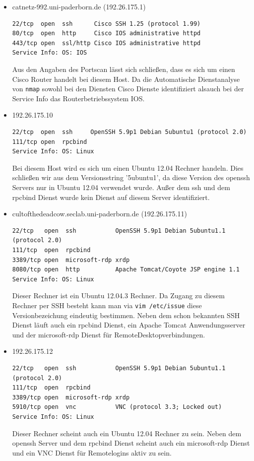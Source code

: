 \documentclass[10pt,a4paper]{article}
\begin{document}
\begin{itemize}
\item catnetz-992.uni-paderborn.de (192.26.175.1)
\begin{verbatim}
22/tcp  open  ssh      Cisco SSH 1.25 (protocol 1.99)
80/tcp  open  http     Cisco IOS administrative httpd
443/tcp open  ssl/http Cisco IOS administrative httpd
Service Info: OS: IOS
\end{verbatim}
Aus den Angaben des Portscan lässt sich schließen, dass es sich um einen Cisco Router handelt bei diesem Host. Da die Automatische Dienstanalyse von \texttt{nmap} sowohl bei den Diensten Cisco Dienste identifiziert alsauch bei der Service Info das Routerbetriebssystem IOS. 
\item 192.26.175.10
\begin{verbatim}
22/tcp  open  ssh     OpenSSH 5.9p1 Debian 5ubuntu1 (protocol 2.0)
111/tcp open  rpcbind
Service Info: OS: Linux
\end{verbatim}
Bei diesem Host wird es sich um einen Ubuntu 12.04 Rechner handeln. Dies schließen wir aus dem Versionsstring '5ubuntu1', da diese Version des openssh Servers nur in Ubuntu 12.04 verwendet wurde. Außer dem ssh und dem rpcbind Dienst wurde kein Dienst auf diesem Server identifiziert.
\item cultofthedeadcow.seclab.uni-paderborn.de (192.26.175.11)
\begin{verbatim}
22/tcp   open  ssh           OpenSSH 5.9p1 Debian 5ubuntu1.1 (protocol 2.0)
111/tcp  open  rpcbind
3389/tcp open  microsoft-rdp xrdp
8080/tcp open  http          Apache Tomcat/Coyote JSP engine 1.1
Service Info: OS: Linux
\end{verbatim}
Dieser Rechner ist ein Ubuntu 12.04.3 Rechner. Da Zugang zu diesem Rechner per SSH besteht kann man via \texttt{vim /etc/issue} diese Versionbezeichung eindeutig bestimmen. Neben dem schon bekannten SSH Dienst läuft auch ein rpcbind Dienst, ein Apache Tomcat Anwendungsserver und der microsoft-rdp Dienst für RemoteDesktopverbindungen.
\item 192.26.175.12
\begin{verbatim}
22/tcp   open  ssh           OpenSSH 5.9p1 Debian 5ubuntu1.1 (protocol 2.0)
111/tcp  open  rpcbind
3389/tcp open  microsoft-rdp xrdp
5910/tcp open  vnc           VNC (protocol 3.3; Locked out)
Service Info: OS: Linux
\end{verbatim}
Dieser Rechner scheint auch ein Ubuntu 12.04 Rechner zu sein. Neben dem openssh Server und dem rpcbind Dienst scheint auch ein microsoft-rdp Dienst und ein VNC Dienst für Remotelogins aktiv zu sein.

\end{itemize}
\end{document}
